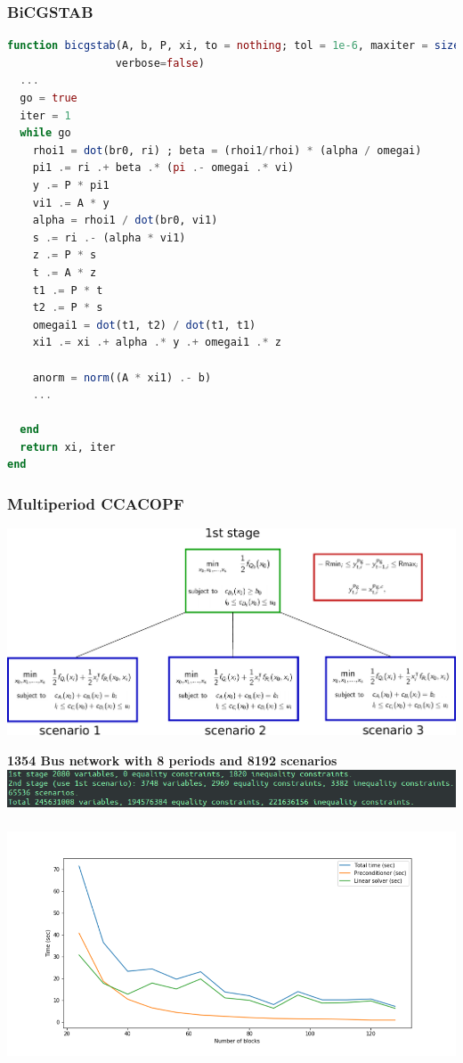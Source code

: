 \begin{frame}[fragile]
  \frametitle{BiCGSTAB}
  \begin{lstlisting}[language=julia, style=jlcodestyle]
function bicgstab(A, b, P, xi, to = nothing; tol = 1e-6, maxiter = size(A,1),
                 verbose=false)
  ...
  go = true
  iter = 1
  while go
    rhoi1 = dot(br0, ri) ; beta = (rhoi1/rhoi) * (alpha / omegai)
    pi1 .= ri .+ beta .* (pi .- omegai .* vi)
    y .= P * pi1
    vi1 .= A * y
    alpha = rhoi1 / dot(br0, vi1)
    s .= ri .- (alpha * vi1)
    z .= P * s
    t .= A * z
    t1 .= P * t
    t2 .= P * s
    omegai1 = dot(t1, t2) / dot(t1, t1)
    xi1 .= xi .+ alpha .* y .+ omegai1 .* z
  
    anorm = norm((A * xi1) .- b)
    ...

  end
  return xi, iter
end
  \end{lstlisting}
\end{frame}


\begin{frame}
  \frametitle{Multiperiod CCACOPF}
  \begin{center}
    \includegraphics[width=\textwidth]{figures/twostageopt}
  \end{center}
  \begin{center}
  {\bf 1354 Bus network with 8 periods and 8192 scenarios}
    \includegraphics[width=\textwidth]{figures/generators}
  \end{center}
\end{frame}

\begin{frame}
  \frametitle{}
   \includegraphics[width=\textwidth]{figures/blocks}
\end{frame}


